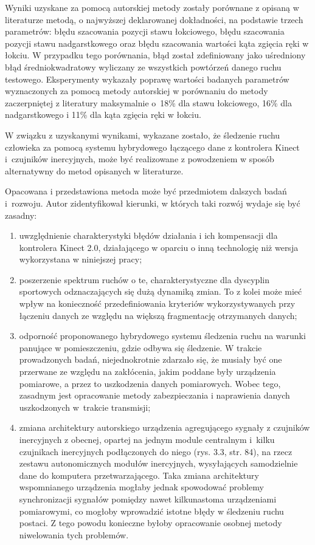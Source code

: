 \documentclass[10pt,a4paper]{article}
\begin{document}
Wyniki uzyskane za pomocą autorskiej metody zostały porównane z opisaną w literaturze metodą, o najwyższej deklarowanej dokładności, na podstawie trzech parametrów: błędu szacowania pozycji stawu łokciowego, błędu szacowania pozycji stawu nadgarstkowego oraz błędu szacowania wartości kąta zgięcia ręki w łokciu. W przypadku tego porównania, błąd został zdefiniowany jako uśredniony błąd średniokwadratowy wyliczany ze wszystkich powtórzeń danego ruchu testowego. Eksperymenty wykazały poprawę wartości badanych parametrów wyznaczonych za pomocą metody autorskiej w porównaniu do metody zaczerpniętej z literatury maksymalnie o~18\% dla stawu łokciowego, 16\% dla nadgarstkowego i 11\% dla kąta zgięcia ręki w łokciu.

W związku z uzyskanymi wynikami, wykazane zostało, że śledzenie ruchu człowieka za pomocą systemu hybrydowego łączącego dane z kontrolera Kinect i~czujników inercyjnych, może być realizowane z powodzeniem w sposób alternatywny do metod opisanych w literaturze.

Opacowana i przedstawiona metoda może być przedmiotem dalszych badań i~rozwoju. Autor zidentyfikował kierunki, w których taki rozwój wydaje się być zasadny:

\begin{enumerate}
	\item uwzględnienie charakterystyki błędów działania i ich kompensacji dla kontrolera Kinect 2.0, działającego w oparciu o inną technologię niż wersja wykorzystana w niniejszej pracy;
	\item poszerzenie spektrum ruchów o te, charakterystyczne dla dyscyplin sportowych odznaczających się dużą dynamiką zmian. To z kolei może mieć wpływ na konieczność przedefiniowania kryteriów wykorzystywanych przy łączeniu danych ze względu na większą fragmentację otrzymanych danych;
	\item odporność proponowanego hybrydowego systemu śledzenia ruchu na warunki panujące w pomieszczeniu, gdzie odbywa się śledzenie. W trakcie prowadzonych badań, niejednokrotnie zdarzało się, że musiały być one przerwane ze względu na zakłócenia, jakim poddane były urządzenia pomiarowe, a przez to uszkodzenia danych pomiarowych. Wobec tego, zasadnym jest opracowanie metody zabezpieczania i naprawienia danych uszkodzonych w~trakcie transmisji;
	\item zmiana architektury autorskiego urządzenia agregującego sygnały z czujników inercyjnych z obecnej, opartej na jednym module centralnym i~kilku czujnikach inercyjnych podłączonych do niego (rys. 3.3, str. 84), na rzecz zestawu autonomicznych modułów inercyjnych, wysyłających samodzielnie dane do komputera przetwarzającego. Taka zmiana architektury wspomnianego urządzenia mogłaby jednak spowodować problemy synchronizacji sygnałów pomiędzy nawet kilkunastoma urządzeniami pomiarowymi, co mogłoby wprowadzić istotne błędy w śledzeniu ruchu postaci. Z tego powodu konieczne byłoby opracowanie osobnej metody niwelowania tych problemów.
\end{enumerate}
\end{document}
